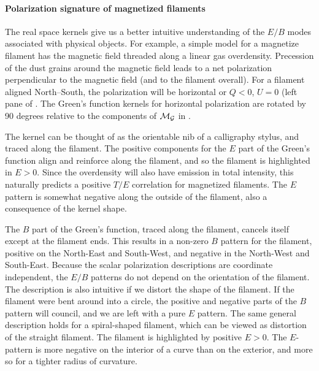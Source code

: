 \paragraph{Polarization signature of magnetized filaments}
The real space kernels give us a better intuitive understanding of the $E/B$ modes associated with physical objects.  For example, a simple model for a magnetize filament has the magnetic field threaded along a linear gas overdensity.  Precession of the dust grains around the magnetic field leads to a net polarization perpendicular to the magnetic field (and to the filament overall).  For a filament aligned North--South, the polarization will be horizontal or $Q<0$, $U=0$ (left pane of .  The Green's function kernels for horizontal polarization are rotated by 90 degrees relative to the components of $\cal{M}_G$ in .

The kernel can be thought of as the orientable nib of a calligraphy stylus, and traced along the filament.  The positive components for the $E$ part of the Green's function align and reinforce along the filament, and so the filament is highlighted in $E>0$.  Since the overdensity will also have emission in total intensity, this naturally predicts a positive $T/E$ correlation for magnetized filaments.  The $E$ pattern is somewhat negative along the outside of the filament, also a consequence of the kernel shape.

The $B$ part of the Green's function, traced along the filament, cancels itself except at the filament ends.  This results in a non-zero $B$ pattern for the filament, positive on the North-East and South-West, and negative in the North-West and South-East.  
Because the scalar polarization descriptions are coordinate independent, the $E/B$ patterns do not depend on the orientation of the filament.
The description is also intuitive if we distort the shape of the filament.  If the filament were bent around into a circle, the positive and negative parts of the $B$ pattern will council, and we are left with a pure $E$ pattern.  
The same general description holds for a spiral-shaped filament, which can be viewed as distortion of the straight filament.  The filament is highlighted by positive $E>0$.  The $E$-pattern is more negative on the interior of a curve than on the exterior, and more so for a tighter radius of curvature.


